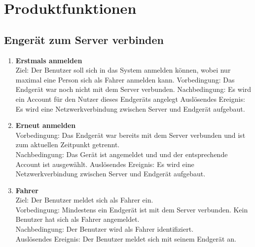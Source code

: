 \documentclass[pflichtenheft.tex]{subfiles}
\begin{document}
\chapter{Produktfunktionen}

\renewcommand{\theenumi}{/FA\ifnum \value{enumi}<10 0\fi\arabic{enumi}0/}
\renewcommand{\labelenumi}{\theenumi}
\renewcommand{\theenumii}{\arabic{enumii}}
\renewcommand{\labelenumii}{/FA\ifnum \value{enumi}<10 0\fi\arabic{enumi}\arabic{enumii}/}

\section{Engerät zum Server verbinden}
	\begin{enumerate}
		\item{\textbf{Erstmals anmelden}}\\ Ziel: Der Benutzer soll sich in das System anmelden können, wobei nur maximal eine Person sich als Fahrer anmelden kann.
		Vorbedingung: Das Endgerät war noch nicht mit dem Server verbunden.
		Nachbedingung: Es wird ein Account für den Nutzer dieses Endgeräts angelegt
		Auslösendes Ereignis: Es wird eine Netzwerkverbindung zwischen Server und Endgerät aufgebaut.

		\item{\textbf{Erneut anmelden}}
		\\Vorbedingung: Das Endgerät war bereits mit dem Server verbunden und ist zum aktuellen Zeitpunkt getrennt. \\Nachbedingung: Das Gerät ist angemeldet und und der entsprechende Account ist ausgewählt.
		Auslösendes Ereignis: Es wird eine Netzwerkverbindung zwischen Server und Endgerät aufgebaut.
		\item{\textbf{Fahrer}}\\ Ziel: Der Benutzer meldet sich als Fahrer ein.  \\
		Vorbedingung: Mindestens ein Endgerät ist mit dem Server verbunden. Kein Benutzer hat sich als Fahrer angemeldet.\\
		Nachbedingung: Der Benutzer wird als Fahrer identifiziert. \\
		Auslösendes Ereignis: Der Benutzer meldet sich mit seinem Endgerät an.
		\setcounter{enumTemp}{\value{enumi}}
		

	\end{enumerate}
\end{document}
